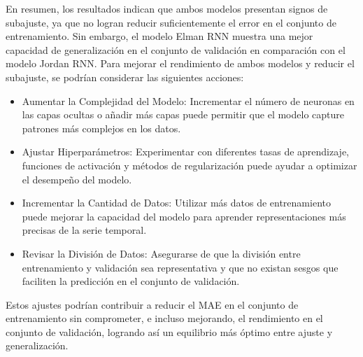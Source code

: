 \documentclass[
]{book}
\begin{document}
En resumen, los resultados indican que ambos modelos presentan signos de subajuste, ya que no logran reducir suficientemente el error en el conjunto de entrenamiento. Sin embargo, el modelo Elman RNN muestra una mejor capacidad de generalización en el conjunto de validación en comparación con el modelo Jordan RNN. Para mejorar el rendimiento de ambos modelos y reducir el subajuste, se podrían considerar las siguientes acciones:

\begin{itemize}
\item
  Aumentar la Complejidad del Modelo: Incrementar el número de neuronas en las capas ocultas o añadir más capas puede permitir que el modelo capture patrones más complejos en los datos.
\item
  Ajustar Hiperparámetros: Experimentar con diferentes tasas de aprendizaje, funciones de activación y métodos de regularización puede ayudar a optimizar el desempeño del modelo.
\item
  Incrementar la Cantidad de Datos: Utilizar más datos de entrenamiento puede mejorar la capacidad del modelo para aprender representaciones más precisas de la serie temporal.
\item
  Revisar la División de Datos: Asegurarse de que la división entre entrenamiento y validación sea representativa y que no existan sesgos que faciliten la predicción en el conjunto de validación.
\end{itemize}

Estos ajustes podrían contribuir a reducir el MAE en el conjunto de entrenamiento sin comprometer, e incluso mejorando, el rendimiento en el conjunto de validación, logrando así un equilibrio más óptimo entre ajuste y generalización.

  
\end{document}
